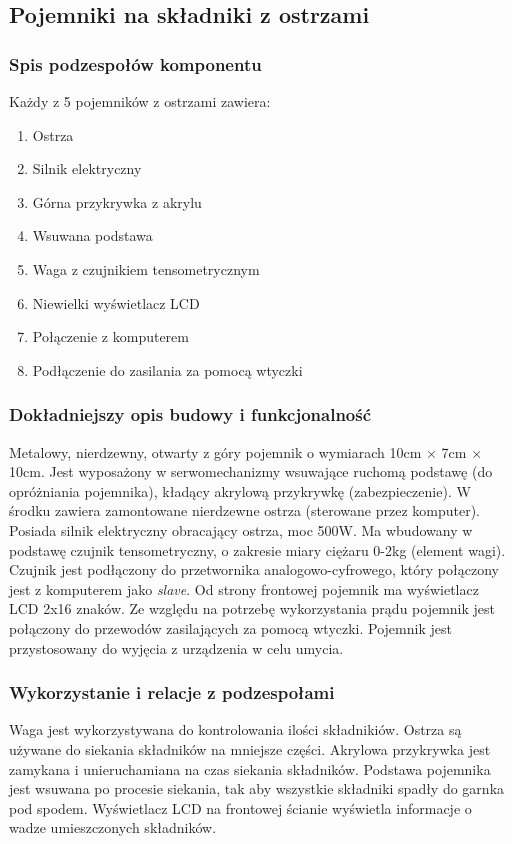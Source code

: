 \documentclass[12pt,a4paper,notitlepage]{report}
\begin{document}
\subsection{Pojemniki na składniki z ostrzami}
\subsubsection{Spis podzespołów komponentu}
Każdy z 5 pojemników z ostrzami zawiera:
\begin{enumerate}
  \item Ostrza
  \item Silnik elektryczny
  \item Górna przykrywka z akrylu
  \item Wsuwana podstawa
  \item Waga z czujnikiem tensometrycznym
  \item Niewielki wyświetlacz LCD
  \item Połączenie z komputerem
  \item Podłączenie do zasilania za pomocą wtyczki
\end{enumerate}

\subsubsection{Dokładniejszy opis budowy i funkcjonalność}
Metalowy, nierdzewny, otwarty z góry pojemnik o wymiarach 10cm $\times$ 7cm $\times$ 10cm. Jest wyposażony w serwomechanizmy wsuwające ruchomą podstawę (do opróżniania pojemnika), kładący akrylową przykrywkę (zabezpieczenie). W środku zawiera zamontowane nierdzewne ostrza (sterowane przez komputer). Posiada silnik elektryczny obracający ostrza, moc 500W. Ma wbudowany w podstawę czujnik tensometryczny, o zakresie miary ciężaru 0-2kg (element wagi). Czujnik jest podłączony do przetwornika analogowo-cyfrowego, który połączony jest z komputerem jako \emph{slave}. Od strony frontowej pojemnik ma wyświetlacz LCD 2x16 znaków. Ze względu na potrzebę wykorzystania prądu pojemnik jest połączony do przewodów zasilających za pomocą wtyczki. Pojemnik jest przystosowany do wyjęcia z urządzenia w celu umycia.
 
\subsubsection{Wykorzystanie i relacje z podzespołami}
Waga jest wykorzystywana do kontrolowania ilości składnikiów. Ostrza są używane do siekania składników na mniejsze części. Akrylowa przykrywka jest zamykana i unieruchamiana na czas siekania składników. Podstawa pojemnika jest wsuwana po procesie siekania, tak aby wszystkie składniki spadły do garnka pod spodem. Wyświetlacz LCD na frontowej ścianie wyświetla informacje o wadze umieszczonych składników.
\end{document}
